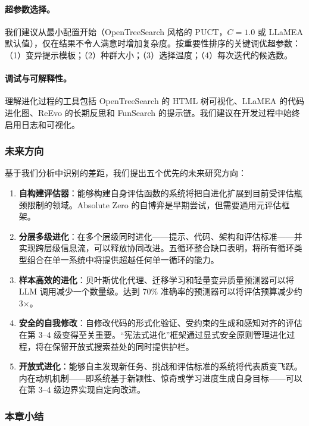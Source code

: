 \paragraph{超参数选择。}
我们建议从最小配置开始（OpenTreeSearch 风格的 PUCT，$C=1.0$ 或 LLaMEA 默认值），仅在结果不令人满意时增加复杂度。按重要性排序的关键调优超参数：（1）变异提示模板；（2）种群大小；（3）选择温度；（4）每次迭代的候选数。

\paragraph{调试与可解释性。}
理解进化过程的工具包括 OpenTreeSearch 的 HTML 树可视化、LLaMEA 的代码进化图、ReEvo 的长期反思和 FunSearch 的提示链。我们建议在开发过程中始终启用日志和可视化。


\subsubsection{未来方向}

基于我们分析中识别的差距，我们提出五个优先的未来研究方向：

\begin{enumerate}
    \item \textbf{自构建评估器}：能够构建自身评估函数的系统将把自进化扩展到目前受评估瓶颈限制的领域。Absolute Zero 的自博弈是早期尝试，但需要通用元评估框架。

    \item \textbf{分层多级进化}：在多个层级同时进化——提示、代码、架构和评估标准——并实现跨层级信息流，可以释放协同改进。五循环整合缺口表明，将所有循环类型组合在单一系统中将提供超越任何单一循环的能力。

    \item \textbf{样本高效的进化}：贝叶斯优化代理、迁移学习和轻量变异质量预测器可以将 LLM 调用减少一个数量级。达到 70\% 准确率的预测器可以将评估预算减少约 3$\times$。

    \item \textbf{安全的自我修改}：自修改代码的形式化验证、受约束的生成和感知对齐的评估在第 3--4 级变得至关重要。``宪法式进化''框架通过显式安全原则管理进化过程，将在保留开放式搜索益处的同时提供护栏。

    \item \textbf{开放式进化}：能够自主发现新任务、挑战和评估标准的系统将代表质变飞跃。内在动机机制——即系统基于新颖性、惊奇或学习进度生成自身目标——可以在第 3--4 级边界实现自定向改进。
\end{enumerate}


\subsubsection{本章小结}

